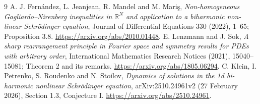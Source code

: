 \documentclass[11pt,a4paper]{article}
\theoremstyle{remark}\newtheorem{remark}[theorem]{Remark}
\newcommand{\R}{\mathbb R}\newcommand{\C}{\mathbb C}
\begin{document}
\begin{thebibliography}{9}
 A. J. Fern\'andez, L. Jeanjean, R. Mandel and M. Mari\c{s},
\emph{Non-homogeneous Gagliardo--Nirenberg inequalities in $\R^N$ and application to a biharmonic non-linear Schr\"odinger equation},
Journal of Differential Equations 330 (2022), 1--65; Proposition 3.8.
\url{https://arxiv.org/abs/2010.01448}.
 E. Lenzmann and J. Sok,
\emph{A sharp rearrangement principle in Fourier space and symmetry results for PDEs with arbitrary order},
International Mathematics Research Notices (2021), 15040--15081; Theorem 2 and its remarks.
\url{https://arxiv.org/abs/1805.06294}.
 C. Klein, I. Petrenko, S. Roudenko and N. Stoilov,
\emph{Dynamics of solutions in the 1d bi-harmonic nonlinear Schr\"odinger equation},
arXiv:2510.24961v2 (27 February 2026), Section 1.3, Conjecture I.
\url{https://arxiv.org/abs/2510.24961}.
\end{thebibliography}
\end{document}
